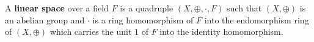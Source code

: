 A \textbf{linear space} over a field $F$ is a quadruple $(X, \oplus, \cdot, F)$ such that $(X, \oplus)$ is an abelian group and $\cdot$ is a ring homomorphism of $F$ into the endomorphism ring of $(X, \oplus)$ which carries the unit $1$ of $F$ into the identity homomorphism.
